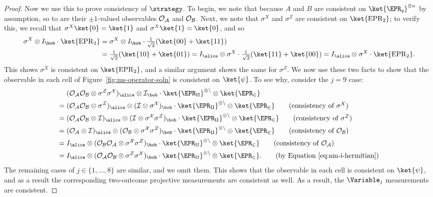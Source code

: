 \begin{proof}
  Now we use this to prove consistency of $\strategy$.
  To begin, we note that because $A$ and $B$ are consistent on $\ket{\EPR_q}^{\otimes n}$ by assumption,
  so to are their $\pm 1$-valued observables $\cal{O}_A$ and $\cal{O}_B$.
  Next, we note that $\sigma^X$ and $\sigma^Z$ are consistent on $\ket{\mathrm{EPR}_2}$;
  to verify this, we recall that $\sigma^X \ket{0} = \ket{1}$ and $\sigma^X \ket{1} = \ket{0}$, and so
  \begin{align*}
  \sigma^X \otimes I_{\bob} \cdot \ket{\mathrm{EPR}_2}
&  =   \sigma^X \otimes I_{\bob} \cdot \tfrac{1}{\sqrt{2}} (\ket{00} + \ket{11})\\
&  = \tfrac{1}{\sqrt{2}} (\ket{10} + \ket{01})
    =    I_{\alice} \otimes \sigma^X \cdot \tfrac{1}{\sqrt{2}} (\ket{11} + \ket{00})
    =    I_{\alice} \otimes \sigma^X \cdot \ket{\mathrm{EPR}_2}.
  \end{align*}
  This shows $\sigma^X$ is consistent on $\ket{\mathrm{EPR}_2}$,
  and a similar argument shows the same for $\sigma^Z$.
  We now use these two facts to show that the observable in each cell of
  Figure~\ref{fig:ms-operator-soln} is consistent on $\ket{\psi}$.
  To see why, consider the $j = 9$ case:
  \begin{align*}
&  (\cal{O}_A \cal{O}_B \otimes \sigma^Z \sigma^X)_\alice \otimes I_\bob
		\cdot \ket{\EPR_q}^{\otimes n} \otimes \ket{\EPR_2} \\
  ={}& (\cal{O}_A \cal{O}_B \otimes \sigma^Z)_\alice \otimes (I \otimes \sigma^X)_\bob
  		\cdot \ket{\EPR_q}^{\otimes n} \otimes \ket{\EPR_2}\tag{consistency of $\sigma^X$}\\
  ={}& (\cal{O}_A \cal{O}_B \otimes I)_\alice \otimes (I \otimes \sigma^X\sigma^Z)_\bob
  		\cdot \ket{\EPR_q}^{\otimes n} \otimes \ket{\EPR_2}\tag{consistency of $\sigma^Z$}\\
  ={}& (\cal{O}_A \otimes I)_\alice \otimes ( \cal{O}_B \otimes \sigma^X\sigma^Z)_\bob
  		\cdot \ket{\EPR_q}^{\otimes n} \otimes \ket{\EPR_2}\tag{consistency of $\cal{O}_B$}\\
  ={}& I_\alice \otimes (\cal{O}_B \cal{O}_A \otimes \sigma^X\sigma^Z)_\bob
  		\cdot \ket{\EPR_q}^{\otimes n} \otimes \ket{\EPR_2}\tag{consistency of $\cal{O}_A$}\\
  ={}& I_\alice \otimes (\cal{O}_A \cal{O}_B \otimes \sigma^Z \sigma^X)_\bob
  		\cdot \ket{\EPR_q}^{\otimes n} \otimes \ket{\EPR_2}. \tag{by Equation~\eqref{eq:am-i-hermitian}}
  \end{align*}
  The remaining cases of $j \in\{1, \ldots, 8\}$ are similar, and we omit them.
  This shows that the observable in each cell is consistent on $\ket{\psi}$,
  and as a result the corresponding two-outcome projective measurements are consistent as well.
  As a result, the $\Variable_j$ measurements are consistent.
  

\end{proof}
